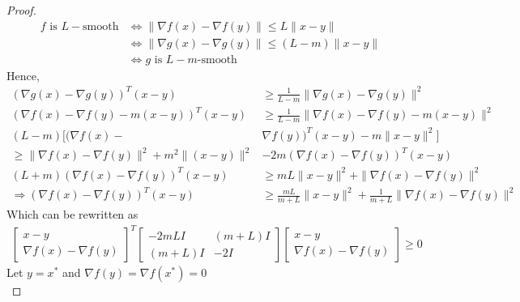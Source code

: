 \documentclass[11pt]{elegantbook}
\begin{document}
\begin{proof}
\begin{equation}
    \begin{aligned}
        \text{$f$ is $L-$smooth}&\Leftrightarrow\|\nabla f(x)-\nabla f(y)\|\leq L\|x-y\|\\
        &\Leftrightarrow\|\nabla g(x)-\nabla g(y)\|\leq (L-m)\|x-y\|\\
        &\Leftrightarrow\text{$g$ is $L-m$-smooth}
    \end{aligned}
    \nonumber
\end{equation}
Hence,
\begin{equation}
    \begin{aligned}
        (\nabla g(x)-\nabla g(y))^T(x-y)&\geq \frac{1}{L-m}\|\nabla g(x)-\nabla g(y)\|^2\\
        (\nabla f(x)-\nabla f(y)-m(x-y))^T(x-y)&\geq \frac{1}{L-m}\|\nabla f(x)-\nabla f(y)-m(x-y)\|^2\\
        (L-m)[(\nabla f(x)-&\nabla f(y))^T(x-y)-m\|x-y\|^2]\\
        \geq \|\nabla f(x)-\nabla f(y)\|^2+m^2\|(x-y)\|^2&-2m(\nabla f(x)-\nabla f(y))^T(x-y)\\
        (L+m)(\nabla f(x)-\nabla f(y))^T(x-y)&\geq mL\|x-y\|^2+\|\nabla f(x)-\nabla f(y)\|^2\\
        \Rightarrow	(\nabla f(x)-\nabla f(y))^T(x-y)&\geq\frac{mL}{m+L}\|x-y\|^2+\frac{1}{m+L}\|\nabla f(x)-\nabla f(y)\|^2
    \end{aligned}
    \nonumber
\end{equation}
Which can be rewritten as
\begin{equation}
    \begin{aligned}
        \begin{bmatrix}
            x-y\\
            \nabla f(x)-\nabla f(y)
        \end{bmatrix}^T
        \begin{bmatrix}
            -2mLI&	(m+L)I\\
            (m+L)I	&-2I
        \end{bmatrix}
        \begin{bmatrix}
            x-y\\
            \nabla f(x)-\nabla f(y)
        \end{bmatrix}\geq 0
    \end{aligned}
    \nonumber
\end{equation}
Let $y=x^*$ and $\nabla f(y)=\nabla f(x^*)=0$
\begin{equation}

\end{equation}
\end{proof}
\end{document}
